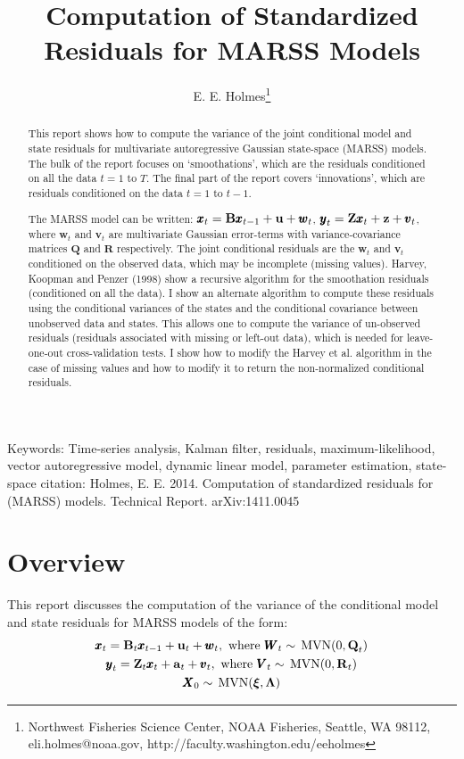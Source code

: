 \documentclass[]{article}
\def\xixi{\mbox{\boldmath $\xi$}}
\def\LAM{\mbox{\boldmath $\Lambda$}}
\def\UPS{\mbox{\boldmath $\Upsilon$}}
\def\XI{\mbox{\boldmath $\Xi$}}
\def\BB{\mbox{$\mathbf B$}}	\def\bb{\mbox{$\mathbf b$}} \def\Bb{\mbox{$\mathbf J$}} \def\Ba{\mbox{$\mathbf L$}} \def\Bm{\UPS}
\def\MVN{\,\textup{\textrm{MVN}}}
\def\QQ{\mbox{$\mathbf Q$}}	 \def\qq{\mbox{$\mathbf q$}} \def\Qb{\mbox{$\mathbf G$}}  \def\Qm{\mathbb{Q}}
\def\RR{\mbox{$\mathbf R$}}	 \def\rr{\mbox{$\mathbf r$}} \def\Rb{\mbox{$\mathbf H$}}	\def\Rm{\mathbb{R}}
\def\VV{\mbox{$\pmb{V}$}}	\def\vv{\mbox{$\pmb{v}$}}
\def\WW{\mbox{$\pmb{W}$}}	\def\ww{\mbox{$\pmb{w}$}}
\def\XX{\mbox{$\pmb{X}$}}	\def\xx{\mbox{$\pmb{x}$}}
\def\ZZ{\mbox{$\mathbf Z$}}	\def\zz{\mbox{$\mathbf z$}}	\def\Zb{\mbox{$\mathbf M$}} \def\Za{\mbox{$\mathbf N$}} \def\Zm{\XI}
\begin{document}

\author{E. E. Holmes\footnote{Northwest Fisheries Science Center, NOAA Fisheries, Seattle, WA 98112, 
       eli.holmes@noaa.gov, http://faculty.washington.edu/eeholmes}}
\title{Computation of Standardized Residuals for MARSS Models}
\maketitle
\begin{abstract}
This report shows how to compute the variance of the joint conditional model and state residuals for multivariate autoregressive Gaussian state-space (MARSS) models. The bulk of the report focuses on `smoothations', which are the residuals conditioned on all the data $t=1$ to $T$. The final part of the report covers `innovations', which are residuals conditioned on the data $t=1$ to $t-1$.  

The MARSS model can be written: $\xx_t=\BB\xx_{t-1}+\uu+\ww_t$, $\yy_t=\ZZ\xx_t+\zz+\vv_t$, where $\ww_t$ and $\vv_t$ are multivariate Gaussian error-terms with variance-covariance matrices $\QQ$ and $\RR$ respectively. The joint conditional residuals are the $\ww_t$ and $\vv_t$ conditioned on the observed data, which may be incomplete (missing values). Harvey, Koopman and Penzer (1998) show a recursive algorithm for the smoothation residuals (conditioned on all the data). I show an alternate algorithm to compute these residuals using the conditional variances of the states and the conditional covariance between unobserved data and states. This allows one to compute the variance of un-observed residuals (residuals associated with missing or left-out data), which is needed for leave-one-out cross-validation tests. I show how to modify the Harvey et al. algorithm in the case of missing values and how to modify it to return the non-normalized conditional residuals.
\end{abstract}
Keywords: Time-series analysis, Kalman filter, residuals, maximum-likelihood, vector autoregressive model, dynamic linear model, parameter estimation, state-space
\vfill
{\noindent \small citation: Holmes, E. E. 2014. Computation of standardized residuals for (MARSS) models. Technical Report. arXiv:1411.0045 }
 \newpage
 
\section{Overview}

This report discusses the computation of the variance of the conditional model and state residuals for MARSS models of the  form:
\begin{equation}\label{eq:residsMARSS}
\begin{gathered}
\xx_t = \BB_t\xx_{t-1} + \uu_t + \ww_t, \text{ where } \WW_t \sim \MVN(0,\QQ_t)\\
\yy_t = \ZZ_t\xx_t + \aa_t + \vv_t, \text{ where } \VV_t \sim \MVN(0,\RR_t)\\
\XX_0 \sim \MVN(\xixi,\LAM)
\end{gathered}
\end{equation}
\end{document}

